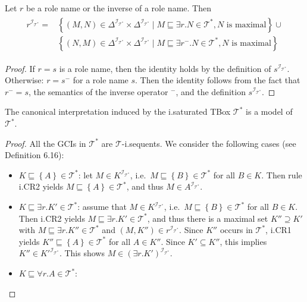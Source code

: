 \begin{lemma}
	Let $r$ be a role name or the inverse of a role name.
	Then
	\begin{align*}
		\begin{split}
			r^{\mathcal{I}_{\mathcal{T}^*}} =& \left\{ (M,N) \in \Delta^{\mathcal{I}_{\mathcal{T}^*}} \times \Delta^{\mathcal{I}_{\mathcal{T}^*}} \mid M \sqsubseteq \exists r.N \in \mathcal{T}^*, N \text{ is maximal}\right\}\cup\\
											 &\left\{ (N,M) \in \Delta^{\mathcal{I}_{\mathcal{T}^*}} \times \Delta^{\mathcal{I}_{\mathcal{T}^*}} \mid M \sqsubseteq \exists r^-.N \in \mathcal{T}^*, N \text{ is maximal}\right\}
		\end{split}
	\end{align*}
\end{lemma}
\begin{proof}
	If $r = s$ is a role name, then the identity holds by the definition of $s^{\mathcal{I}_{\mathcal{T}^*}}$.
	Otherwise: $r = s^-$ for a role name $s$.
	Then the identity follows from the fact that $r^- = s$,
	the semantics of the inverse operator ${}^-$,
	and the definition $s^{\mathcal{I}_{\mathcal{T}^*}}$.
\end{proof}
\begin{lemma}
	The canonical interpretation induced by the i.saturated TBox $\mathcal{T}^*$ is a model of $\mathcal{T}^*$.
\end{lemma}
\begin{proof}
	All the GCIs in $\mathcal{T}^*$ are $\mathcal{T}$-i.sequents.
	We consider the following cases (see Definition 6.16):
	\begin{itemize}
		\item $K \sqsubseteq \left\{ A \right\} \in \mathcal{T}^*$:
			let $M \in K^{\mathcal{I}_{\mathcal{T}^*}}$, i.e.\ $M \sqsubseteq \left\{ B \right\} \in \mathcal{T}^*$ for all $B \in K$.
			Then rule i.CR2 yields $M \sqsubseteq \left\{ A \right\} \in \mathcal{T}^*$,
			and thus $M \in A^{\mathcal{I}_{\mathcal{T}^*}}$.
		\item $K \sqsubseteq \exists r.K' \in \mathcal{T}^*$:
			assume that $M \in K^{\mathcal{I}_{\mathcal{T}^*}}$, i.e.\ $M \sqsubseteq \left\{ B \right\} \in \mathcal{T}^*$ for all $B \in K$.
			Then i.CR2 yields $M \sqsubseteq \exists r.K' \in \mathcal{T}^*$,
			and thus there is a maximal set $K'' \supseteq K'$ with $M \sqsubseteq \exists r.K'' \in \mathcal{T}^*$
			and $(M, K'') \in r^{\mathcal{I}_{\mathcal{T}^*}}$.
			Since $K''$ occurs in $\mathcal{T}^*$,
			i.CR1 yields $K '' \sqsubseteq \left\{ A \right\} \in \mathcal{T}^*$ for all $A \in K''$.
			Since $K' \subseteq K''$, this implies $K'' \in K'^{\mathcal{I}_{\mathcal{T}^*}}$.
			This shows $M \in \left( \exists r.K' \right)^{\mathcal{I}_{\mathcal{T}^*}}$.
		\item $K \sqsubseteq \forall r.A \in \mathcal{T}^*$:
	\end{itemize}
\end{proof}
